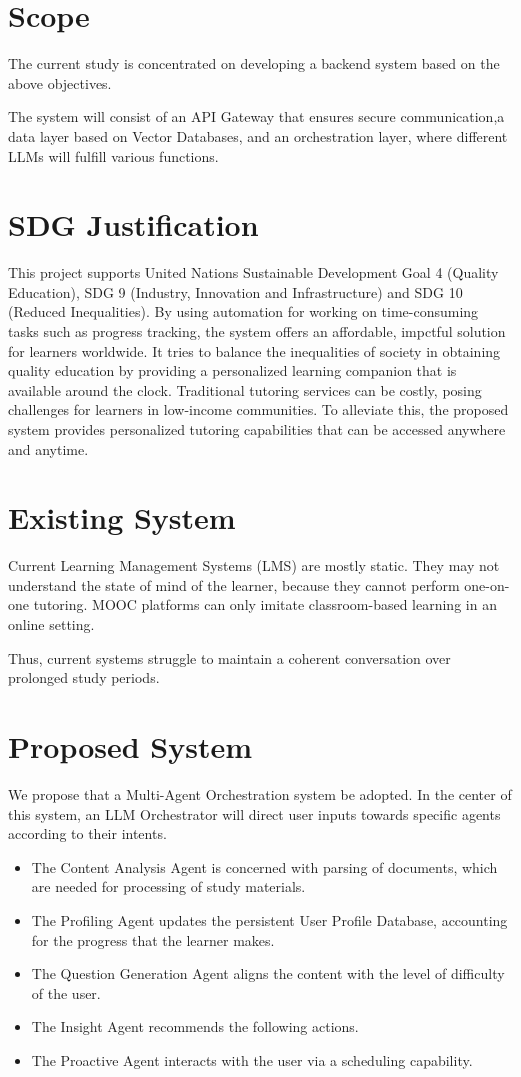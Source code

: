 \section{Scope}
The current study is concentrated on developing a backend system based on the above objectives.

The system will consist of an API Gateway that ensures secure communication,a data layer based on Vector Databases, and an orchestration layer, where different LLMs will fulfill various functions.

\section{SDG Justification}
This project supports United Nations Sustainable Development Goal 4 (Quality Education), SDG 9 (Industry, Innovation and Infrastructure) and SDG 10 (Reduced Inequalities). By using automation for working on time-consuming tasks such as progress tracking, the system offers an affordable, impctful solution for learners worldwide. It tries to balance the inequalities of society in obtaining quality education by providing a personalized learning companion that is available around the clock. Traditional tutoring services can be costly, posing challenges for learners in low-income communities. To alleviate this, the proposed system provides personalized tutoring capabilities that can be accessed anywhere and anytime.

\section{Existing System}
Current Learning Management Systems (LMS) are mostly static. They may not understand the state of mind of the learner, because they cannot perform one-on-one tutoring. MOOC platforms can only imitate classroom-based learning in an online setting.

Thus, current systems struggle to maintain a coherent conversation over prolonged study periods.

\section{Proposed System}
We propose that a Multi-Agent Orchestration system be adopted. In the center of this system, an LLM Orchestrator will direct user inputs towards specific agents according to their intents.

\begin{itemize}
	\item The Content Analysis Agent is concerned with parsing of documents, which are needed for processing of study materials.
	\item The Profiling Agent updates the persistent User Profile Database, accounting for the progress that the learner makes.
	\item The Question Generation Agent aligns the content with the level of difficulty of the user.
    \item The Insight Agent recommends the following actions.
    \item The Proactive Agent interacts with the user via a scheduling capability.
\end{itemize}

